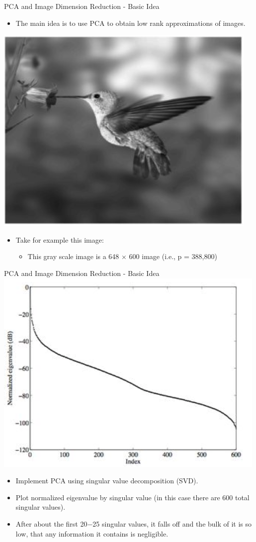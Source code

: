 \documentclass[
  ignorenonframetext,
]{beamer}
\providecommand{\tightlist}{%
  \setlength{\itemsep}{0pt}\setlength{\parskip}{0pt}}
\begin{document}
\begin{frame}{PCA and Image Dimension Reduction - Basic Idea}
\protect\hypertarget{pca-and-image-dimension-reduction---basic-idea}{}
\begin{itemize}
\tightlist
\item
  The main idea is to use PCA to obtain low rank approximations of
  images.
\end{itemize}

\includegraphics[width=0.5\linewidth,style="float:right; padding:20px"]{images/fig2a}

\begin{itemize}
\tightlist
\item
  Take for example this image:

  \begin{itemize}
  \tightlist
  \item
    This gray scale image is a 648 \(\times\) 600 image (i.e., p =
    388,800)
  \end{itemize}
\end{itemize}
\end{frame}

\begin{frame}{PCA and Image Dimension Reduction - Basic Idea}
\protect\hypertarget{pca-and-image-dimension-reduction---basic-idea-1}{}
\includegraphics[width=0.4\linewidth,style="float:right; padding:20px"]{images/fig2b}

\begin{itemize}
\item
  Implement PCA using singular value decomposition (SVD).
\item
  Plot normalized eigenvalue by singular value (in this case there are
  600 total singular values).
\item
  After about the first 20−25 singular values, it falls off and the bulk
  of it is so low, that any information it contains is negligible.
\end{itemize}
\end{frame}
\end{document}
